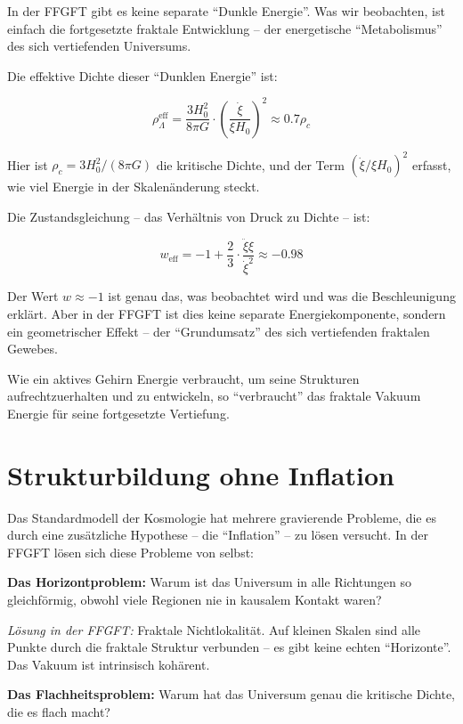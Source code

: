 \documentclass[12pt,a4paper]{article}
\begin{document}
In der FFGFT gibt es keine separate ``Dunkle Energie''. Was wir beobachten, ist einfach die fortgesetzte fraktale Entwicklung -- der energetische ``Metabolismus'' des sich vertiefenden Universums.

Die effektive Dichte dieser ``Dunklen Energie'' ist:

\begin{equation}
\rho_{\Lambda}^{\text{eff}} = \frac{3H_0^2}{8\pi G} \cdot \left(\frac{\dot{\xi}}{\xi H_0}\right)^2 \approx 0.7 \rho_c
\end{equation}

Hier ist $\rho_c = 3H_0^2/(8\pi G)$ die kritische Dichte, und der Term $(\dot{\xi}/\xi H_0)^2$ erfasst, wie viel Energie in der Skalenänderung steckt.

Die Zustandsgleichung -- das Verhältnis von Druck zu Dichte -- ist:

\begin{equation}
w_{\text{eff}} = -1 + \frac{2}{3} \cdot \frac{\ddot{\xi}\xi}{\dot{\xi}^2} \approx -0.98
\end{equation}

Der Wert $w \approx -1$ ist genau das, was beobachtet wird und was die Beschleunigung erklärt. Aber in der FFGFT ist dies keine separate Energiekomponente, sondern ein geometrischer Effekt -- der ``Grundumsatz'' des sich vertiefenden fraktalen Gewebes.

Wie ein aktives Gehirn Energie verbraucht, um seine Strukturen aufrechtzuerhalten und zu entwickeln, so ``verbraucht'' das fraktale Vakuum Energie für seine fortgesetzte Vertiefung.

\section{Strukturbildung ohne Inflation}

Das Standardmodell der Kosmologie hat mehrere gravierende Probleme, die es durch eine zusätzliche Hypothese -- die ``Inflation'' -- zu lösen versucht. In der FFGFT lösen sich diese Probleme von selbst:

\textbf{Das Horizontproblem:} Warum ist das Universum in alle Richtungen so gleichförmig, obwohl viele Regionen nie in kausalem Kontakt waren?

\textit{Lösung in der FFGFT:} Fraktale Nichtlokalität. Auf kleinen Skalen sind alle Punkte durch die fraktale Struktur verbunden -- es gibt keine echten ``Horizonte''. Das Vakuum ist intrinsisch kohärent.

\textbf{Das Flachheitsproblem:} Warum hat das Universum genau die kritische Dichte, die es flach macht?
\end{document}
